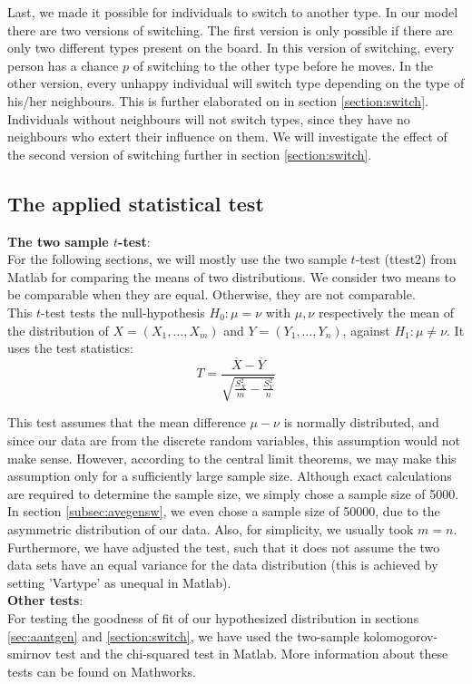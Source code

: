 Last, we made it possible for individuals to switch to another type.
In our model there are two versions of switching.
The first version is only possible if there are only two different types present on the board.
In this version of switching, every person has a chance $p$ of switching to the other type before he moves.
In the other version, every unhappy individual will switch type depending on the type of his/her neighbours.
This is further elaborated on in section \ref{section:switch}.
Individuals without neighbours will not switch types, since they have no neighbours who extert their influence on them.
We will investigate the effect of the second version of switching further in section \ref{section:switch}.
\subsection{The applied statistical test}\label{subsec:stattest}
\textbf{The two sample \(t\)-test}:\\
For the following sections, we will mostly use the two sample \(t\)-test (ttest2) from Matlab for comparing the means of two distributions. We consider two means to be comparable when they are equal. Otherwise, they are not comparable.\\

This \(t\)-test tests the null-hypothesis $H_0:\mu=\nu$ with $\mu,\nu$ respectively the mean of the distribution of $X=(X_1,\dotsc,X_m)$ and $Y=(Y_1,\dotsc,Y_n)$, against $H_1:\mu\neq\nu$. It uses the test statistics:
 \[T=\frac{\overline{X}-\overline{Y}}{\sqrt{\frac{S^2_X}{m}-\frac{S^2_Y}{n}}}\]

This test assumes that the mean difference $\mu-\nu$ is normally distributed, and since our data are from the discrete random variables, this assumption would not make sense. 
However, according to the central limit theorems, we may make this assumption only for a sufficiently large sample size. 
Although exact calculations are required to determine the sample size, we simply chose a sample size of 5000. In section \ref{subsec:avegensw}, we even chose a sample size of 50000, due to the asymmetric distribution of our data. 
Also, for simplicity, we usually took $m=n$. Furthermore, we have adjusted the test, such that it does not assume the two data sets have an equal variance for the data distribution (this is achieved by setting 'Vartype' as unequal in Matlab).\\

\textbf{Other tests}:\\
For testing the goodness of fit of our hypothesized distribution in sections \ref{sec:aantgen} and \ref{section:switch}, we have used the two-sample kolomogorov-smirnov test and the chi-squared test in Matlab. More information about these tests can be found on Mathworks.  


